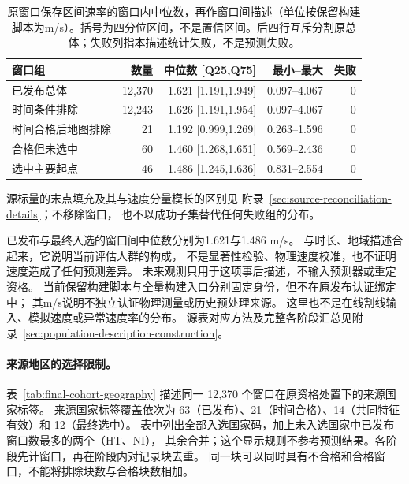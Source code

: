 \documentclass[UTF8,11pt]{ctexart}
\begin{document}
\begin{table}[htbp]
\centering\small
\caption{原窗口保存区间速率的窗口内中位数，再作窗口间描述（单位按保留构建脚本为m/s）。括号为四分位区间，不是置信区间。后四行互斥分割原总体；失败列指本描述统计失败，不是预测失败。}
\label{tab:final-cohort-speeds}
\begin{tabular}{@{}lrrrr@{}}
\toprule
窗口组 & 数量 & 中位数 [Q25,Q75] & 最小--最大 & 失败\\
\midrule
已发布总体 & 12,370 & 1.621 [1.191,1.949] & 0.097--4.067 & 0\\
时间条件排除 & 12,243 & 1.626 [1.191,1.954] & 0.097--4.067 & 0\\
时间合格后地图排除 & 21 & 1.192 [0.999,1.269] & 0.263--1.596 & 0\\
合格但未选中 & 60 & 1.460 [1.268,1.651] & 0.569--2.436 & 0\\
选中主要起点 & 46 & 1.486 [1.245,1.636] & 0.831--2.554 & 0\\
\bottomrule
\end{tabular}
\end{table}

源标量的末点填充及其与速度分量模长的区别见
附录~\ref{sec:source-reconciliation-details}；不移除窗口，
也不以成功子集替代任何失败组的分布。

已发布与最终入选的窗口间中位数分别为1.621与1.486 m/s。
与时长、地域描述合起来，它说明当前评估人群的构成，
不是显著性检验、物理速度校准，也不证明速度造成了任何预测差异。
未来观测只用于这项事后描述，不输入预测器或重定资格。
当前保留构建脚本与全量构建入口分别固定身份，但不在原发布认证绑定中；
其m/s说明不独立认证物理测量或历史预处理来源。
这里也不是在线割线输入、模拟速度或异常速度率的分布。
源表对应方法及完整各阶段汇总见附录~\ref{sec:population-description-construction}。

\paragraph{来源地区的选择限制。}\label{sec:final-cohort-geography}
表~\ref{tab:final-cohort-geography} 描述同一 12,370 个窗口在原资格处置下的来源国家标签。
来源国家标签覆盖依次为
63（已发布）、21（时间合格）、14（共同特征有效）和 12（最终选中）。
表中列出全部入选国家码，加上未入选国家中已发布窗口数最多的两个（HT、NI），
其余合并；这个显示规则不参考预测结果。各阶段先计窗口，再在阶段内对记录块去重。
同一块可以同时具有不合格和合格窗口，不能将排除块数与合格块数相加。
\end{document}
